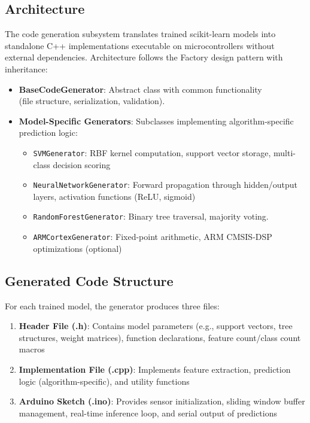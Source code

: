 \subsection{Architecture}
The code generation subsystem translates trained scikit-learn models into standalone C++ implementations executable on microcontrollers without external dependencies. Architecture follows the Factory design pattern with inheritance:
\begin{itemize}
    \item \textbf{BaseCodeGenerator}: Abstract class with common functionality\\(file structure, serialization, validation).
    \item \textbf{Model-Specific Generators}: Subclasses implementing algorithm-specific prediction logic:
    \begin{itemize}
        \item \texttt{SVMGenerator}: RBF kernel computation, support vector storage, multi-class decision scoring
        \item \texttt{NeuralNetworkGenerator}: Forward propagation through hidden/output layers, activation functions (ReLU, sigmoid)
\item \texttt{RandomForestGenerator}: Binary tree traversal, majority voting.
        \item \texttt{ARMCortexGenerator}: Fixed-point arithmetic, ARM CMSIS-DSP optimizations (optional)
    \end{itemize}
\end{itemize}

\subsection{Generated Code Structure}
For each trained model, the generator produces three files:
\begin{enumerate}
    \item \textbf{Header File (.h)}: Contains model parameters (e.g., support vectors, tree structures, weight matrices), function declarations, feature count/class count macros
    \item \textbf{Implementation File (.cpp)}: Implements feature extraction, prediction logic (algorithm-specific), and utility functions
    \item \textbf{Arduino Sketch (.ino)}: Provides sensor initialization, sliding window buffer management, real-time inference loop, and serial output of predictions
\end{enumerate}

